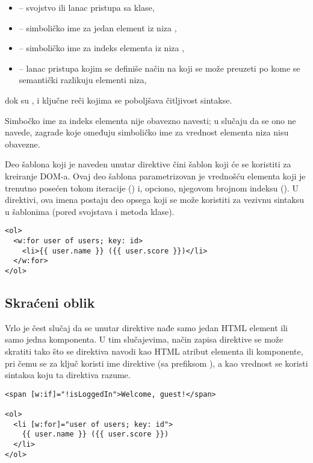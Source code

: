 \begin{itemize}
\item {} -- svojstvo ili lanac pristupa sa klase,
\item {} -- simboličko ime za jedan element iz niza ,
\item {} -- simboličko ime za indeks elementa  iz niza ,
\item {} -- lanac pristupa kojim se definiše način na koji se može preuzeti  po kome se semantički razlikuju elementi niza,
\end{itemize}

dok su , \code{;} i  ključne reči kojima se poboljšava čitljivost sintakse.

Simbočko ime za indeks elementa nije obavezno navesti; u slučaju da se ono ne navede, zagrade koje omeđuju simboličko ime za vrednost elementa niza nisu obavezne.

Deo šablona koji je naveden unutar direktive čini šablon koji će se koristiti za kreiranje DOM-a.
Ovaj deo šablona parametrizovan je vrednošću elementa koji je trenutno posećen tokom iteracije () i, opciono, njegovom brojnom indeksu ().
U direktivi, ova imena postaju deo opsega koji se može koristiti za vezivnu sintaksu u šablonima (pored svojstava i metoda klase).

\begin{verbatim}
<ol>
  <w:for user of users; key: id>
    <li>{{ user.name }} ({{ user.score }})</li>
  </w:for>
</ol>
\end{verbatim}

\subsection{Skraćeni oblik}

Vrlo je čest slučaj da se unutar direktive nađe samo jedan HTML element ili samo jedna komponenta.
U tim slučajevima, način zapisa direktive se može skratiti tako što se direktiva navodi kao HTML atribut elementa ili komponente, pri čemu se za ključ koristi ime direktive (sa prefiksom ), a kao vrednost se koristi sintaksa koju ta direktiva razume.

\begin{verbatim}
<span [w:if]="!isLoggedIn">Welcome, guest!</span>

<ol>
  <li [w:for]="user of users; key: id">
    {{ user.name }} ({{ user.score }})
  </li>
</ol>
\end{verbatim}

